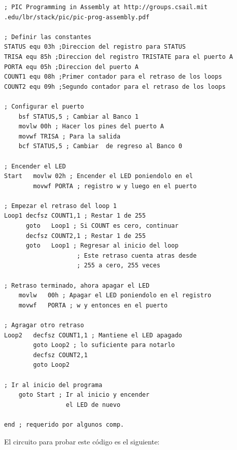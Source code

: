 \documentclass[conference]{IEEEtran}
\begin{document}
    \bigbreak

    \begin{lstlisting}[language={[x86masm]Assembler}, caption=Programa en
    ensamblador para PIC16F84 que enciende y apaga un LED]
; PIC Programming in Assembly at http://groups.csail.mit
.edu/lbr/stack/pic/pic-prog-assembly.pdf

; Definir las constantes
STATUS equ 03h ;Direccion del registro para STATUS
TRISA equ 85h ;Direccion del registro TRISTATE para el puerto A
PORTA equ 05h ;Direccion del puerto A
COUNT1 equ 08h ;Primer contador para el retraso de los loops
COUNT2 equ 09h ;Segundo contador para el retraso de los loops

; Configurar el puerto
    bsf STATUS,5 ; Cambiar al Banco 1
    movlw 00h ; Hacer los pines del puerto A
    movwf TRISA ; Para la salida
    bcf STATUS,5 ; Cambiar  de regreso al Banco 0

; Encender el LED
Start   movlw 02h ; Encender el LED poniendolo en el
        movwf PORTA ; registro w y luego en el puerto

; Empezar el retraso del loop 1
Loop1 decfsz COUNT1,1 ; Restar 1 de 255
      goto   Loop1 ; Si COUNT es cero, continuar
      decfsz COUNT2,1 ; Restar 1 de 255
      goto   Loop1 ; Regresar al inicio del loop
                    ; Este retraso cuenta atras desde
                    ; 255 a cero, 255 veces

; Retraso terminado, ahora apagar el LED
    movlw   00h ; Apagar el LED poniendolo en el registro
    movwf   PORTA ; w y entonces en el puerto

; Agragar otro retraso
Loop2   decfsz COUNT1,1 ; Mantiene el LED apagado
        goto Loop2 ; lo suficiente para notarlo
        decfsz COUNT2,1
        goto Loop2

; Ir al inicio del programa
    goto Start ; Ir al inicio y encender
                 el LED de nuevo

end ; requerido por algunos comp.
    \end{lstlisting}

    \bigbreak

    El circuito para probar este código es el siguiente:

    \bigbreak
\end{document}
